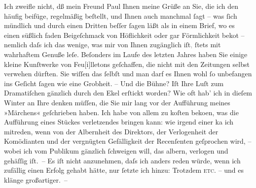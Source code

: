 \pstart
           Ich zweifle nicht, dß mein Freund Paul Ihnen
               meine Grüße \introOben{}an Sie,\introOben{} die ich den \label{K_L03908-2v}\label{K_L03908-2} häufig beifüge, regelmäßig beſtellt,
               und {\pb}Ihnen auch manchmal{ }ſagt – was{ }ſich mündlich und durch
               einen Dritten beſſer{ }ſagen läßt als in einem Brief, wo es einen süßlich faden
               Beigeſchmack von Höflichkeit oder gar Förmlichkeit beko{\geminationm}t – nemlich daſs ich das wenige, was mir von Ihnen zugänglich iſt\textcolor{gray}{,}{ }ſtets mit
               wahrhaftem Genuße leſe. Beſonders im Laufe des letzten Jahres haben Sie einige kleine
               Kunſtwerke {\pb}von Feu{[}i{]}lletons
               geſchaffen, die nicht mit den Zeitungen selbst verwehen dürften. Sie wiſſen das{ }ſelbſt und man darf es Ihnen wohl{ }ſo unbefangen ins Geſicht{ }ſagen wie eine Grobheit.
               – Und die Bühne? Iſt Ihre Luſt zum Dramatiſchen gänzlich durch den Ekel erſtickt
               worden? Wie oft hab’ ich in dieſem Winter an Ihre \label{K_L03908-3v}\label{K_L03908-3} denken müſſen, die Sie mir
               lang vor der Aufführung meines »Märchens«
               geſchrieben haben. {\pb}Ich habe von allem zu koſten beko{\geminationm}en, was die Aufführung eines Stückes verletzendes
               bringen kann: wie irgend einer ka{\geminationn} ich mitreden, wenn
               von der Albernheit des Direktors, der Verlogenheit der Komödianten und der vergnügten
               Gefälligkeit der Recenſenten geſprochen wird, – wobei ich vom Publikum gänzlich{ }ſchweigen will, das albern, verlogen und gehäſſig iſt. – Es iſt nicht anzunehmen,
               daſs ich anders reden würde, wenn {\pb}ich zufällig einen
               Erfolg gehabt hätte, nur{ }ſetzte ich hinzu: Trotzdem {\dotsfour}{ }\textsc{etc.} – und es klänge großartiger. –\pend
           
